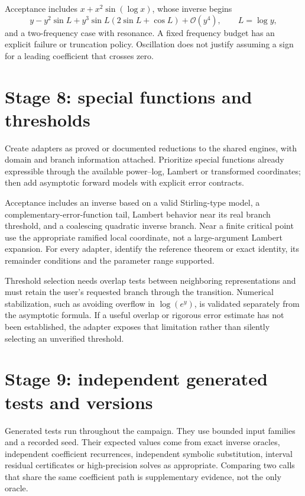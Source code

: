 \documentclass[11pt,a4paper]{article}
\newcommand{\OO}{\mathcal O}
\begin{document}
Acceptance includes $x+x^2\sin(\log x)$, whose inverse begins
\[
 y-y^2\sin L+y^3\sin L(2\sin L+\cos L)+\OO(y^4),
 \qquad L=\log y,
\]
and a two-frequency case with resonance. A fixed frequency budget has an explicit failure or truncation policy. Oscillation does not justify assuming a sign for a leading coefficient that crosses zero.

\section{Stage 8: special functions and thresholds}

Create adapters as proved or documented reductions to the shared engines, with domain and branch information attached. Prioritize special functions already expressible through the available power--log, Lambert or transformed coordinates; then add asymptotic forward models with explicit error contracts.

Acceptance includes an inverse based on a valid Stirling-type model, a complementary-error-function tail, Lambert behavior near its real branch threshold, and a coalescing quadratic inverse branch. Near a finite critical point use the appropriate ramified local coordinate, not a large-argument Lambert expansion. For every adapter, identify the reference theorem or exact identity, its remainder conditions and the parameter range supported.

Threshold selection needs overlap tests between neighboring representations and must retain the user's requested branch through the transition. Numerical stabilization, such as avoiding overflow in $\log(e^y)$, is validated separately from the asymptotic formula. If a useful overlap or rigorous error estimate has not been established, the adapter exposes that limitation rather than silently selecting an unverified threshold.

\section{Stage 9: independent generated tests and versions}

Generated tests run throughout the campaign. They use bounded input families and a recorded seed. Their expected values come from exact inverse oracles, independent coefficient recurrences, independent symbolic substitution, interval residual certificates or high-precision solves as appropriate. Comparing two calls that share the same coefficient path is supplementary evidence, not the only oracle.
\end{document}
